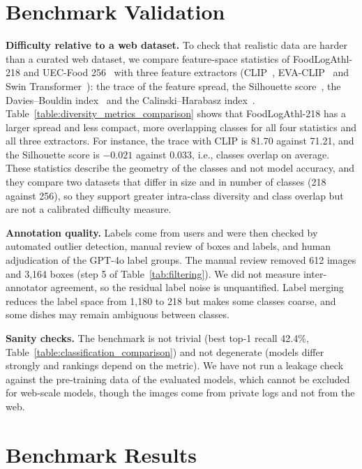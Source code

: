 \documentclass[sigconf, nonacm]{acmart}
\begin{document}
\section{Benchmark Validation}
\textbf{Difficulty relative to a web dataset.} To check that realistic data are harder than a curated web dataset, we compare feature-space statistics of FoodLogAthl-218 and UEC-Food 256~\cite{kawano2015automatic} with three feature extractors (CLIP~\cite{CLIP}, EVA-CLIP~\cite{sun2023eva} and Swin Transformer~\cite{liu2021swin}): the trace of the feature spread, the Silhouette score~\cite{rousseeuw1987silhouettes}, the Davies--Bouldin index~\cite{davies1979cluster} and the Calinski--Harabasz index~\cite{calinski1974dendrite}. Table~\ref{table:diversity_metrics_comparison} shows that FoodLogAthl-218 has a larger spread and less compact, more overlapping classes for all four statistics and all three extractors. For instance, the trace with CLIP is 81.70 against 71.21, and the Silhouette score is $-0.021$ against $0.033$, i.e., classes overlap on average. These statistics describe the geometry of the classes and not model accuracy, and they compare two datasets that differ in size and in number of classes (218 against 256), so they support greater intra-class diversity and class overlap but are not a calibrated difficulty measure.



\textbf{Annotation quality.} Labels come from users and were then checked by automated outlier detection, manual review of boxes and labels, and human adjudication of the GPT-4o label groups. The manual review removed 612 images and 3,164 boxes (step 5 of Table~\ref{tab:filtering}). We did not measure inter-annotator agreement, so the residual label noise is unquantified. Label merging reduces the label space from 1,180 to 218 but makes some classes coarse, and some dishes may remain ambiguous between classes.

\textbf{Sanity checks.} The benchmark is not trivial (best top-1 recall 42.4\%, Table~\ref{table:classification_comparison}) and not degenerate (models differ strongly and rankings depend on the metric). We have not run a leakage check against the pre-training data of the evaluated models, which cannot be excluded for web-scale models, though the images come from private logs and not from the web.

\section{Benchmark Results}
\end{document}

